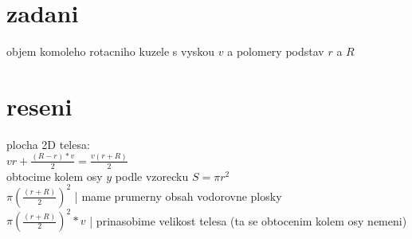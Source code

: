 \documentclass[a4paper]{article}
\begin{document}
\section*{zadani}
objem komoleho rotacniho kuzele s vyskou $v$ a polomery podstav
$r$ a $R$

\section*{reseni}
plocha 2D telesa:\\
$vr+\frac{(R-r)*v}{2} = \frac{v(r+R)}{2}$\\
obtocime kolem osy $y$ podle vzorecku $S=\pi r^2$\\
$\pi (\frac{(r+R)}{2})^2$ | mame prumerny obsah vodorovne plosky\\
$\pi (\frac{(r+R)}{2})^2 * v$ | prinasobime velikost telesa (ta se obtocenim kolem osy nemeni)\\
\end{document}
